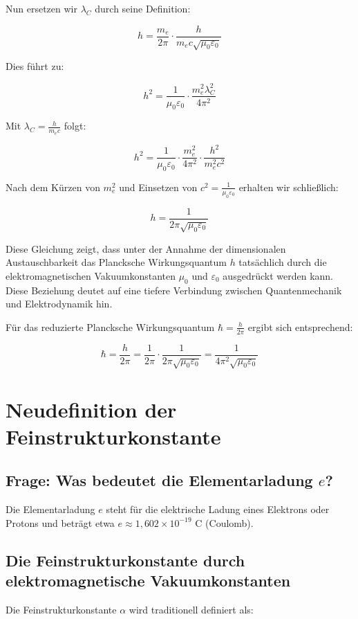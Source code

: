 \documentclass{article}
\begin{document}
	Nun ersetzen wir $\lambda_C$ durch seine Definition:
	
	$$h = \frac{m_e}{2\pi} \cdot \frac{h}{m_e c \sqrt{\mu_0\varepsilon_0}}$$
	
	Dies führt zu:
	
	$$h^2 = \frac{1}{\mu_0\varepsilon_0} \cdot \frac{m_e^2 \lambda_C^2}{4\pi^2}$$
	
	Mit $\lambda_C = \frac{h}{m_e c}$ folgt:
	
	$$h^2 = \frac{1}{\mu_0\varepsilon_0} \cdot \frac{m_e^2}{4\pi^2} \cdot \frac{h^2}{m_e^2c^2}$$
	
	Nach dem Kürzen von $m_e^2$ und Einsetzen von $c^2 = \frac{1}{\mu_0\varepsilon_0}$ erhalten wir schließlich:
	
	$$h = \frac{1}{2\pi\sqrt{\mu_0\varepsilon_0}}$$
	
	Diese Gleichung zeigt, dass unter der Annahme der dimensionalen Austauschbarkeit das Plancksche Wirkungsquantum $h$ tatsächlich durch die elektromagnetischen Vakuumkonstanten $\mu_0$ und $\varepsilon_0$ ausgedrückt werden kann. Diese Beziehung deutet auf eine tiefere Verbindung zwischen Quantenmechanik und Elektrodynamik hin.
	
	Für das reduzierte Plancksche Wirkungsquantum $\hbar = \frac{h}{2\pi}$ ergibt sich entsprechend:
	
	$$\hbar = \frac{h}{2\pi} = \frac{1}{2\pi} \cdot \frac{1}{2\pi\sqrt{\mu_0\varepsilon_0}} = \frac{1}{4\pi^2\sqrt{\mu_0\varepsilon_0}}$$
	
	\section{Neudefinition der Feinstrukturkonstante}
	
	\subsection{Frage: Was bedeutet die Elementarladung $e$?}
	
	Die Elementarladung $e$ steht für die elektrische Ladung eines Elektrons oder Protons und beträgt etwa $e \approx 1,602 \times 10^{-19}$ C (Coulomb).
	
	\subsection{Die Feinstrukturkonstante durch elektromagnetische Vakuumkonstanten}
	
	Die Feinstrukturkonstante $\alpha$ wird traditionell definiert als:
	
\end{document}
